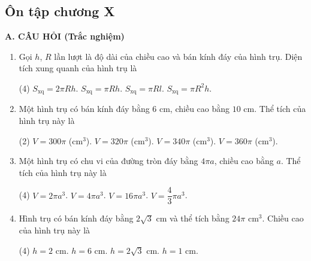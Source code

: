 \begin{practice}
    \subsection{Ôn tập chương X}

    \textbf{A. CÂU HỎI (Trắc nghiệm)}

    \begin{enumerate}
        \item Gọi $h$, $R$ lần lượt là độ dài của chiều cao và bán kính đáy của hình trụ. Diện tích xung quanh của hình trụ là
        \begin{tasks}(4)
            \task $S_{\mathrm{xq}}=2\pi Rh$.
            \task $S_{\mathrm{xq}}=\pi Rh$.
            \task $S_{\mathrm{xq}}=\pi Rl$.
            \task $S_{\mathrm{xq}}=\pi R^2h$.
        \end{tasks}
        \par\noindent\answerbox\par

        \item Một hình trụ có bán kính đáy bằng $6$ cm, chiều cao bằng $10$ cm. Thể tích của hình trụ này là
        \begin{tasks}(2)
            \task $V=300\pi$ (cm$^3$).
            \task $V=320\pi$ (cm$^3$).
            \task $V=340\pi$ (cm$^3$).
            \task $V=360\pi$ (cm$^3$).
        \end{tasks}
        \par\noindent\answerbox\par

        \item Một hình trụ có chu vi của đường tròn đáy bằng $4\pi a$, chiều cao bằng $a$. Thể tích của hình trụ này là
        \begin{tasks}(4)
            \task $V=2\pi a^3$.
            \task $V=4\pi a^3$.
            \task $V=16\pi a^3$.
            \task $V=\dfrac{4}{3}\pi a^3$.
        \end{tasks}
        \par\noindent\answerbox\par

        \item Hình trụ có bán kính đáy bằng $2\sqrt{3}$ cm và thể tích bằng $24\pi$ cm$^3$. Chiều cao của hình trụ này là
        \begin{tasks}(4)
            \task $h=2$ cm.
            \task $h=6$ cm.
            \task $h=2\sqrt{3}$ cm.
            \task $h=1$ cm.
        \end{tasks}
        \par\noindent\answerbox\par


\end{enumerate}
\end{practice}
